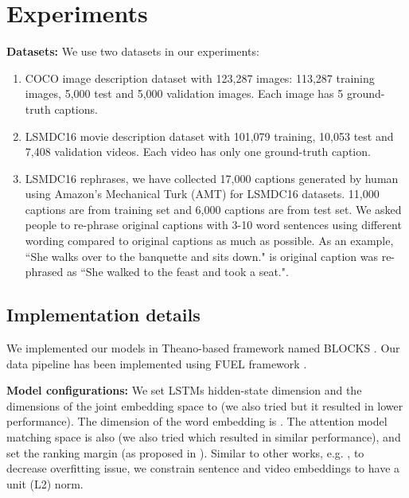 \documentclass[runningheads]{llncs}
\begin{document}
\section{Experiments}
\label{experiment}
\noindent
{\bf Datasets:} We use two datasets in our experiments:  
\begin{enumerate}
\item COCO image description dataset \cite{502} with 123,287 images: 113,287 training images, 5,000 test and 5,000 validation images. Each image has 5 ground-truth captions. 
\item LSMDC16 \cite{LSMDC15} movie description dataset with 101,079 training, 10,053 test and 7,408 validation videos. Each video has only one ground-truth caption.
\item LSMDC16 \cite{LSMDC15} rephrases, we have collected 17,000 captions generated by human using Amazon's Mechanical Turk (AMT) for LSMDC16 datasets. 11,000 captions are from training set and 6,000 captions are from test set. We asked people to re-phrase original captions with 3-10 word sentences using different wording compared to original captions as much as possible. As an example, ``She walks over to the banquette and sits down." is original caption was re-phrased as ``She walked to the feast and took a seat.".
\end{enumerate}
\subsection{Implementation details}
 We implemented our models in Theano-based framework named BLOCKS \cite{Bastien-Theano-2012,MerrienboerBDSW15}. Our data pipeline has been implemented using FUEL framework \cite{MerrienboerBDSW15}.
 
\noindent
{\bf Model configurations:} We set LSTMs hidden-state dimension and the dimensions of the joint embedding space to  (we also tried  but it resulted in lower performance). The dimension of the word embedding is . The attention model matching space is also  (we also tried  which resulted in similar performance), and set the ranking margin  (as proposed in \cite{IvanVendrov2015}). Similar to other works, e.g. \cite{kiros15tacl,IvanVendrov2015}, to decrease overfitting issue, we constrain sentence and video embeddings to have a unit (L2) norm. 
\end{document}
